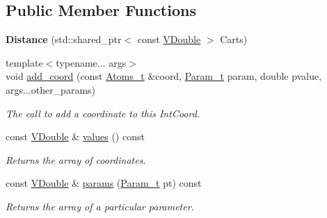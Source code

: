 \subsection*{Public Member Functions}
\begin{DoxyCompactItemize}
\item 
{\bfseries Distance} (std\+::shared\+\_\+ptr$<$ const \hyperlink{classFManII_1_1IntCoords_af42df2795dec16350f908cfd5ac2ef06}{V\+Double} $>$ Carts)\hypertarget{classFManII_1_1Distance_a4266618c8a07a07ac8c29e22f2c289b7}{}\label{classFManII_1_1Distance_a4266618c8a07a07ac8c29e22f2c289b7}

\item 
{\footnotesize template$<$typename... args$>$ }\\void \hyperlink{classFManII_1_1IntCoords_aaa13717daa2c47a00c56e8dcb18896b6}{add\+\_\+coord} (const \hyperlink{classFManII_1_1IntCoords_a59ab25571f774fca97644a2ce5ade359}{Atoms\+\_\+t} \&coord, \hyperlink{namespaceFManII_ab331802fde4c5f2564443f1704c25363}{Param\+\_\+t} param, double pvalue, args...\+other\+\_\+params)
\begin{DoxyCompactList}\small\item\em The call to add a coordinate to this Int\+Coord. \end{DoxyCompactList}\item 
const \hyperlink{classFManII_1_1IntCoords_af42df2795dec16350f908cfd5ac2ef06}{V\+Double} \& \hyperlink{classFManII_1_1IntCoords_a8b36508bebeb262d2c41bed1301ad9f9}{values} () const \hypertarget{classFManII_1_1IntCoords_a8b36508bebeb262d2c41bed1301ad9f9}{}\label{classFManII_1_1IntCoords_a8b36508bebeb262d2c41bed1301ad9f9}

\begin{DoxyCompactList}\small\item\em Returns the array of coordinates. \end{DoxyCompactList}\item 
const \hyperlink{classFManII_1_1IntCoords_af42df2795dec16350f908cfd5ac2ef06}{V\+Double} \& \hyperlink{classFManII_1_1IntCoords_ac107ad541179d838052f37538883671a}{params} (\hyperlink{namespaceFManII_ab331802fde4c5f2564443f1704c25363}{Param\+\_\+t} pt) const \hypertarget{classFManII_1_1IntCoords_ac107ad541179d838052f37538883671a}{}\label{classFManII_1_1IntCoords_ac107ad541179d838052f37538883671a}

\begin{DoxyCompactList}\small\item\em Returns the array of a particular parameter. \end{DoxyCompactList}\end{DoxyCompactItemize}
